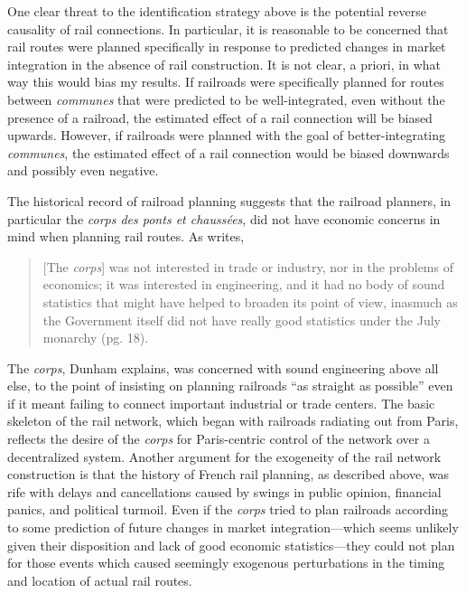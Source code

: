 \documentclass[12pt,twoside]{article}
\begin{document}
One clear threat to the identification strategy above is the potential reverse causality of rail connections.
In particular, it is reasonable to be concerned that rail routes were planned specifically in response to predicted changes in market integration in the absence of rail construction.
It is not clear, a priori, in what way this would bias my results.
If railroads were specifically planned for routes between \emph{communes} that were predicted to be well-integrated, even without the presence of a railroad, the estimated effect of a rail connection will be biased upwards.
However, if railroads were planned with the goal of better-integrating \emph{communes}, the estimated effect of a rail connection would be biased downwards and possibly even negative.

The historical record of railroad planning suggests that the railroad planners, in particular the \emph{corps des ponts et chauss\'{e}es}, did not have economic concerns in mind when planning rail routes.
As \cite{dunham} writes,

\begin{quote}
	[The \emph{corps}] was not interested in trade or industry, nor in the problems of economics; it was interested in engineering, and it had no body of sound statistics that might have helped to broaden its point of view, inasmuch as the Government itself did not have really good statistics under the July monarchy (pg. 18).
\end{quote}

The \emph{corps}, Dunham explains, was concerned with sound engineering above all else, to the point of insisting on planning railroads ``as straight as possible'' even if it meant failing to connect important industrial or trade centers.
The basic skeleton of the rail network, which began with railroads radiating out from Paris, reflects the desire of the \emph{corps} for Paris-centric control of the network over a decentralized system.
Another argument for the exogeneity of the rail network construction is that the history of French rail planning, as described above, was rife with delays and cancellations caused by swings in public opinion, financial panics, and political turmoil.
Even if the \emph{corps} tried to plan railroads according to some prediction of future changes in market integration---which seems unlikely given their disposition and lack of good economic statistics---they could not plan for those events which caused seemingly exogenous perturbations in the timing and location of actual rail routes.
\end{document}
